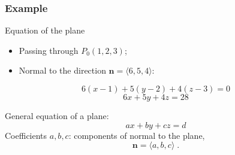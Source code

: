 \begin{frame}
\begin{columns}
  \column{6cm}
\end{columns}
\end{frame}



\begin{frame}
 \frametitle{Example}

Equation of the plane
\begin{itemize}
 \item Passing through $P_0(1,2,3)$;
\item Normal to the direction $\textbf{n} = \langle 6,5,4\rangle$:
\end{itemize}
%
\pause
$$6(x-1) + 5(y-2) + 4(z-3) = 0$$
%
$$6x +5y+4z = 28$$

\pause General equation of a plane:
%
$$ax+by+cz = d$$
%
Coefficients $a,b,c$: \pause components of normal to the plane,
%
$$\textbf{n} = \langle a,b,c\rangle\; .$$

\end{frame}